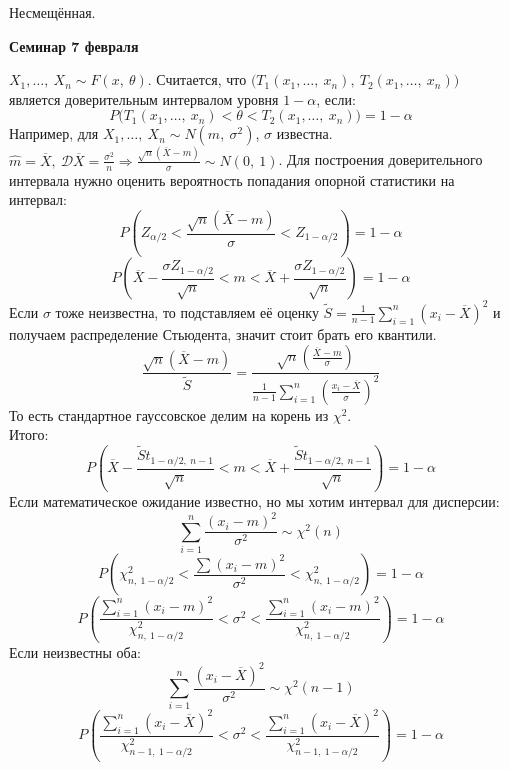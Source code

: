 \documentclass[12pt, a4paper]{article}
\newcommand{\dev}{\mathcal{D}}
\begin{document}
Несмещённая.
\begin{center}
    \bf Семинар 7 февраля
\end{center}
$X_1,\dots,\ X_n \sim F(x,\ \theta)$. Считается, что $\big( T_1(x_1,\dots,\ x_n),\ T_2(x_1,\dots,\ x_n) \big)$ является доверительным интервалом уровня $1 - \alpha$, если:
\[P\big(T_1(x_1,\dots,\ x_n) < \theta < T_2(x_1,\dots,\ x_n)\big) = 1 - \alpha\]
Например, для $X_1,\dots,\ X_n \sim N(m,\ \sigma^2)$, $\sigma$ известна.\\
$\hat m = \overline{X},\ \dev \overline{X} = \frac{\sigma^2}{n}\Rightarrow \frac{\sqrt{n}(\overline{X} - m)}{\sigma} \sim N(0,\ 1)$. Для построения доверительного интервала нужно оценить вероятность попадания опорной статистики на интервал:
\[P\left( Z_{\alpha/2} < \frac{\sqrt{n} (\overline{X} - m)}{\sigma} < Z_{1 - \alpha/2} \right) = 1 - \alpha\]
\[P\left( \overline{X} - \frac{\sigma Z_{1 - \alpha/2}}{\sqrt{n}} < m < \overline{X} + \frac{\sigma Z_{1 - \alpha/2}}{\sqrt{n}} \right) = 1 - \alpha\]
Если $\sigma$ тоже неизвестна, то подставляем её оценку $\tilde S = \frac{1}{n - 1} \sum\limits_{i = 1}^{n} (x_i - \overline{X})^2$ и получаем распределение Стьюдента, значит стоит брать его квантили.
\[\frac{\sqrt{n} (\overline{X} - m)}{\tilde S} = \frac{\sqrt{n} (\frac{\overline{X} - m}{\sigma})}{\frac{1}{n - 1} \sum_{i = 1}^{n} \left( \frac{x_i - \overline{X}}{\sigma} \right)^2}\]
То есть стандартное гауссовское делим на корень из $\chi^2$.\\
Итого:
\[P\left( \overline{X} - \frac{\tilde S t_{1 - \alpha/2,\ n - 1}}{\sqrt{n}} < m < \overline{X} + \frac{\tilde S t_{1 - \alpha/2,\ n - 1}}{\sqrt{n}} \right) = 1 - \alpha\]
Если математическое ожидание известно, но мы хотим интервал для дисперсии:
\[\sum_{i = 1}^{n} \frac{(x_i - m)^2}{\sigma^2} \sim \chi^2(n)\]
\[P\left( \chi^2_{n,\ 1 - \alpha/2} < \frac{\sum(x_i - m)^2}{\sigma^2} < \chi^2_{n,\ 1 - \alpha/2} \right) = 1 - \alpha\]
\[P\left(\frac{\sum_{i = 1}^{n} (x_i - m)^2}{\chi^2_{n,\ 1 - \alpha/2}} < \sigma^2 < \frac{\sum_{i = 1}^{n} (x_i - m)^2}{\chi^2_{n,\ 1 - \alpha/2}} \right) = 1 - \alpha\]
Если неизвестны оба:
\[\sum_{i = 1}^{n} \frac{(x_i - \overline{X})^2}{\sigma^2} \sim \chi^2(n - 1)\]
\[P\left(\frac{\sum_{i = 1}^{n} (x_i - \overline{X})^2}{\chi^2_{n - 1,\ 1 - \alpha/2}} < \sigma^2 < \frac{\sum_{i = 1}^{n} (x_i - \overline{X})^2}{\chi^2_{n - 1,\ 1 - \alpha/2}} \right) = 1 - \alpha\]
\end{document}
